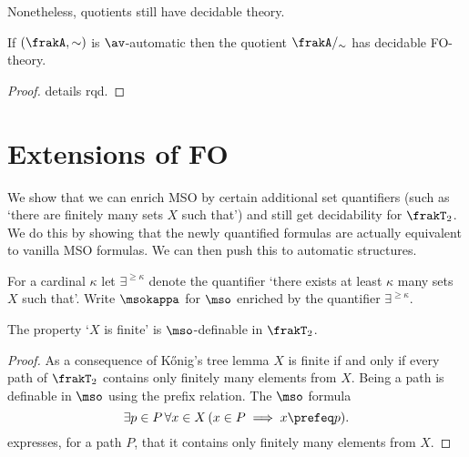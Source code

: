 Nonetheless, quotients still have decidable theory.

\begin{proposition}
If $(\frakA,\sim)$ is $\av$-automatic then the quotient $\frakA/_\sim$ has decidable FO-theory.
\end{proposition}

\begin{proof} 
details rqd.
\end{proof}

\section{Extensions of FO}

We show that we can enrich MSO by certain additional set quantifiers (such as `there are finitely many sets $X$ such that')
and still get decidability  for $\frakT_2$. 
We do this by showing that the newly quantified formulas are actually equivalent to vanilla MSO formulas. We can then push this to 
automatic structures.



For a cardinal $\kappa$ let $\exists^{\geq \kappa}$ denote the quantifier `there exists at least $\kappa$ many sets $X$ such that'.
Write $\msokappa$ for $\mso$ enriched by the quantifier $\exists^{\geq \kappa}$.


\begin{lemma}
The property `$X$ is finite' is $\mso$-definable in $\frakT_2$.
\end{lemma}

\begin{proof}
As a consequence
of K\H{o}nig's tree lemma $X$ is finite if and only if every path of $\frakT_2$
contains only finitely many elements from $X$.  Being a path is definable in
$\mso$ using the prefix relation.  The $\mso$ formula
\[
\exists p \in P \, \forall x \in X\, (x \in P \implies x \prefeq p).
\]
expresses, for a path $P$, that it contains only finitely many elements from $X$.
\end{proof}

